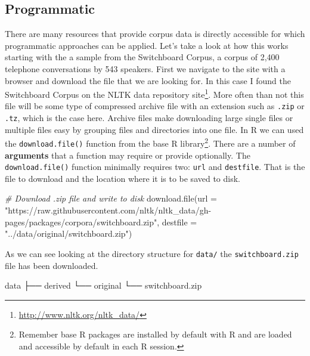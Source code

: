 \documentclass[
  letterpaper,
]{scrbook}
\newenvironment{Shaded}{\begin{snugshade}}{\end{snugshade}}
\newcommand{\AttributeTok}[1]{\textcolor[rgb]{0.00,0.00,0.00}{#1}}
\newcommand{\CommentTok}[1]{\textcolor[rgb]{0.00,0.00,0.00}{\textit{#1}}}
\newcommand{\ExtensionTok}[1]{\textcolor[rgb]{0.00,0.00,0.00}{#1}}
\newcommand{\FunctionTok}[1]{\textcolor[rgb]{0.00,0.00,0.00}{#1}}
\newcommand{\NormalTok}[1]{\textcolor[rgb]{0.00,0.00,0.00}{#1}}
\newcommand{\StringTok}[1]{\textcolor[rgb]{0.00,0.00,0.00}{#1}}
\DeclareRobustCommand{\href}[2]{#2\footnote{\url{#1}}}
\begin{document}
\hypertarget{programmatic}{%
\subsection{Programmatic}\label{programmatic}}

There are many resources that provide corpus data is directly accessible
for which programmatic approaches can be applied. Let's take a look at
how this works starting with the a sample from the Switchboard Corpus, a
corpus of 2,400 telephone conversations by 543 speakers. First we
navigate to the site with a browser and download the file that we are
looking for. In this case I found the Switchboard Corpus on the
\href{http://www.nltk.org/nltk_data/}{NLTK data repository site}. More
often than not this file will be some type of compressed archive file
with an extension such as \texttt{.zip} or \texttt{.tz}, which is the
case here. Archive files make downloading large single files or multiple
files easy by grouping files and directories into one file. In R we can
used the \texttt{download.file()} function from the base R
library\footnote{Remember base R packages are installed by default with
  R and are loaded and accessible by default in each R session.}. There
are a number of \textbf{arguments} that a function may require or
provide optionally. The \texttt{download.file()} function minimally
requires two: \texttt{url} and \texttt{destfile}. That is the file to
download and the location where it is to be saved to disk.

\begin{Shaded}
\begin{Highlighting}[]
\CommentTok{\# Download .zip file and write to disk}
\FunctionTok{download.file}\NormalTok{(}\AttributeTok{url =} \StringTok{"https://raw.githubusercontent.com/nltk/nltk\_data/gh{-}pages/packages/corpora/switchboard.zip"}\NormalTok{, }\AttributeTok{destfile =} \StringTok{"../data/original/switchboard.zip"}\NormalTok{)}
\end{Highlighting}
\end{Shaded}

As we can see looking at the directory structure for \texttt{data/} the
\texttt{switchboard.zip} file has been downloaded.

\begin{Shaded}
\begin{Highlighting}[]
\ExtensionTok{data}
\ExtensionTok{├──}\NormalTok{ derived}
\ExtensionTok{└──}\NormalTok{ original}
    \ExtensionTok{└──}\NormalTok{ switchboard.zip}
\end{Highlighting}
\end{Shaded}
\end{document}
